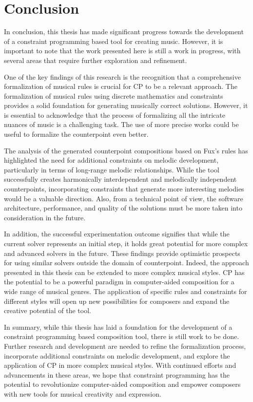 \chapter*{Conclusion}
In conclusion, this thesis has made significant progress towards the development of a constraint programming based tool for creating music. However, it is important to note that the work presented here is still a work in progress, with several areas that require further exploration and refinement.

One of the key findings of this research is the recognition that a comprehensive formalization of musical rules is crucial for CP to be a relevant approach. The formalization of musical rules using discrete mathematics and constraints provides a solid foundation for generating musically correct solutions. However, it is essential to acknowledge that the process of formalizing all the intricate nuances of music is a challenging task. The use of more precise works could be useful to formalize the counterpoint even better.

The analysis of the generated counterpoint compositions based on Fux's rules has highlighted the need for additional constraints on melodic development, particularly in terms of long-range melodic relationships. While the tool successfully creates harmonically interdependent and melodically independent counterpoints, incorporating constraints that generate more interesting melodies would be a valuable direction. Also, from a technical point of view, the software architecture, performance, and quality of the solutions must be more taken into consideration in the future.

In addition, the successful experimentation outcome signifies that while the current solver represents an initial step, it holds great potential for more complex and advanced solvers in the future. These findings provide optimistic prospects for using similar solvers outside the domain of counterpoint. Indeed, the approach presented in this thesis can be extended to more complex musical styles. CP has the potential to be a powerful paradigm in computer-aided composition for a wide range of musical genres. The application of specific rules and constraints for different styles will open up new possibilities for composers and expand the creative potential of the tool.

In summary, while this thesis has laid a foundation for the development of a constraint programming based composition tool, there is still work to be done. Further research and development are needed to refine the formalization process, incorporate additional constraints on melodic development, and explore the application of CP in more complex musical styles. With continued efforts and advancements in these areas, we hope that constraint programming has the potential to revolutionize computer-aided composition and empower composers with new tools for musical creativity and expression.